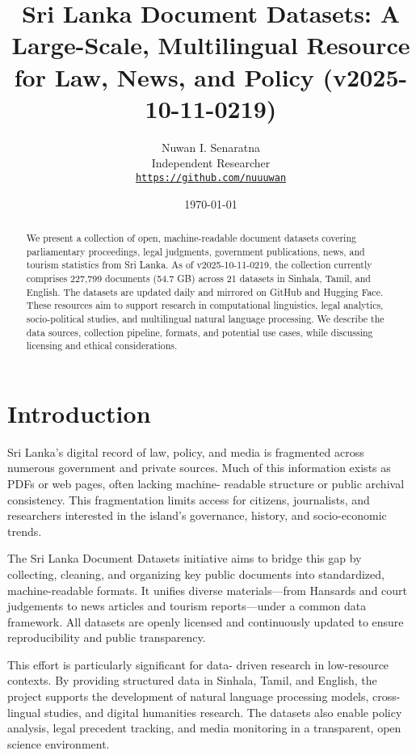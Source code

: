 \documentclass[10pt,a4paper]{article}%
\title{Sri Lanka Document Datasets: A Large{-}Scale, Multilingual Resource for Law, News, and Policy (v2025{-}10{-}11{-}0219)}%
\author{Nuwan I. Senaratna\\Independent Researcher\\\vspace{0.25em}\texttt{\href{https://github.com/nuuuwan}{https://github.com/nuuuwan}}}%
\date{\today}%
\begin{document}
%
\normalsize%
\maketitle%
\begin{abstract}%
We present a collection of open, machine-readable document datasets covering parliamentary proceedings, legal judgments, government publications, news, and tourism statistics from Sri Lanka. As of v2025-10-11-0219,  the collection currently comprises 227,799  documents (54.7 GB) across 21  datasets in Sinhala, Tamil, and English. The datasets are updated daily and mirrored on GitHub and Hugging Face. These resources aim to support research in computational linguistics, legal analytics, socio-political studies, and multilingual natural language processing. We describe the data sources, collection pipeline, formats, and potential use cases, while discussing licensing and ethical considerations.%

%
\end{abstract}%
\section{Introduction}%
\label{sec:Introduction}%
Sri Lanka’s digital record of law, policy, and media is fragmented across numerous government and private sources. Much of this information exists as PDFs or web pages, often lacking machine- readable structure or public archival consistency. This fragmentation limits access for citizens, journalists, and researchers interested in the island’s governance, history, and socio-economic trends.%

%
The Sri Lanka Document Datasets initiative aims to bridge this gap by collecting, cleaning, and organizing key public documents into standardized, machine-readable formats. It unifies diverse materials—from Hansards and court judgements to news articles and tourism reports—under a common data framework. All datasets are openly licensed and continuously updated to ensure reproducibility and public transparency.%

%
This effort is particularly significant for data- driven research in low-resource contexts. By providing structured data in Sinhala, Tamil, and English, the project supports the development of natural language processing models, cross-lingual studies, and digital humanities research. The datasets also enable policy analysis, legal precedent tracking, and media monitoring in a transparent, open science environment.%
\end{document}
